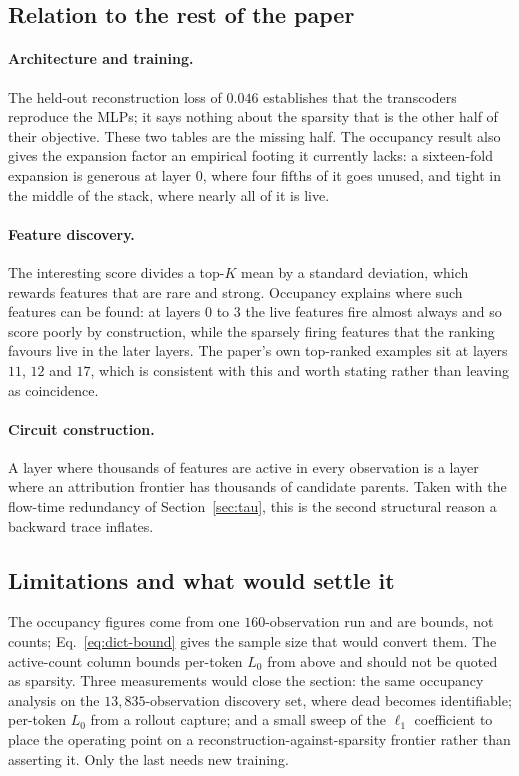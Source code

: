 \subsection{Relation to the rest of the paper}

\paragraph{Architecture and training.} The held-out reconstruction loss of
$0.046$ establishes that the transcoders reproduce the MLPs; it says nothing
about the sparsity that is the other half of their objective. These two tables
are the missing half. The occupancy result also gives the expansion factor an
empirical footing it currently lacks: a sixteen-fold expansion is generous at
layer $0$, where four fifths of it goes unused, and tight in the middle of the
stack, where nearly all of it is live.

\paragraph{Feature discovery.} The interesting score divides a top-$K$ mean by a
standard deviation, which rewards features that are rare and strong. Occupancy
explains where such features can be found: at layers $0$ to $3$ the live
features fire almost always and so score poorly by construction, while the
sparsely firing features that the ranking favours live in the later layers. The
paper's own top-ranked examples sit at layers $11$, $12$ and $17$, which is
consistent with this and worth stating rather than leaving as coincidence.

\paragraph{Circuit construction.} A layer where thousands of features are active
in every observation is a layer where an attribution frontier has thousands of
candidate parents. Taken with the flow-time redundancy of Section~\ref{sec:tau},
this is the second structural reason a backward trace inflates.

\subsection{Limitations and what would settle it}

The occupancy figures come from one $160$-observation run and are bounds, not
counts; Eq.~\ref{eq:dict-bound} gives the sample size that would convert them.
The active-count column bounds per-token $L_0$ from above and should not be
quoted as sparsity. Three measurements would close the section: the same
occupancy analysis on the $13{,}835$-observation discovery set, where dead
becomes identifiable; per-token $L_0$ from a rollout capture; and a small sweep
of the $\ell_1$ coefficient to place the operating point on a
reconstruction-against-sparsity frontier rather than asserting it. Only the last
needs new training.
